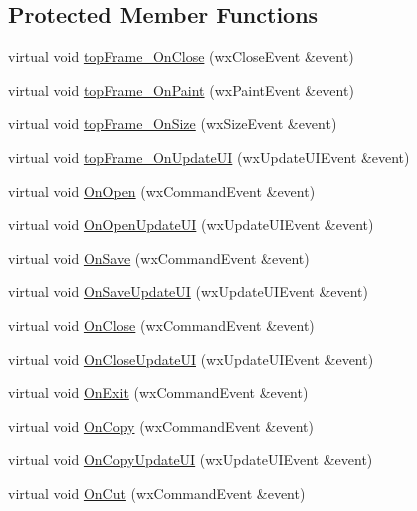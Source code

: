 \subsection*{Protected Member Functions}
\begin{DoxyCompactItemize}
\item 
virtual void \hyperlink{class_top_frame_aa5f73113b1457581e250a3c5fb8f0064}{top\-Frame\-\_\-\-On\-Close} (wx\-Close\-Event \&event)
\item 
virtual void \hyperlink{class_top_frame_a68d78b4baf77908eeccd2e6032b75f1b}{top\-Frame\-\_\-\-On\-Paint} (wx\-Paint\-Event \&event)
\item 
virtual void \hyperlink{class_top_frame_a834d6181bfec63909019441880f665a7}{top\-Frame\-\_\-\-On\-Size} (wx\-Size\-Event \&event)
\item 
virtual void \hyperlink{class_top_frame_ab41da1d8b60a477e0c2b8aa7ce584a54}{top\-Frame\-\_\-\-On\-Update\-U\-I} (wx\-Update\-U\-I\-Event \&event)
\item 
virtual void \hyperlink{class_top_frame_afbbfabd076b41bcab884206b6c6b0526}{On\-Open} (wx\-Command\-Event \&event)
\item 
virtual void \hyperlink{class_top_frame_a47e0020ef6fc50864c3ac66556ca1185}{On\-Open\-Update\-U\-I} (wx\-Update\-U\-I\-Event \&event)
\item 
virtual void \hyperlink{class_top_frame_a0171f3cd74c08fdd1c58e2d9448094ea}{On\-Save} (wx\-Command\-Event \&event)
\item 
virtual void \hyperlink{class_top_frame_a617c3d12f8fd373c84858c4d2f0cef34}{On\-Save\-Update\-U\-I} (wx\-Update\-U\-I\-Event \&event)
\item 
virtual void \hyperlink{class_top_frame_a62e531b947f11cd089a675807ff12269}{On\-Close} (wx\-Command\-Event \&event)
\item 
virtual void \hyperlink{class_top_frame_a5fa1106de0693c88325cd4c64ecbd94c}{On\-Close\-Update\-U\-I} (wx\-Update\-U\-I\-Event \&event)
\item 
virtual void \hyperlink{class_top_frame_aea48b19f458cbbc4c147440cfc690c46}{On\-Exit} (wx\-Command\-Event \&event)
\item 
virtual void \hyperlink{class_top_frame_a9881e6bb8be2e113e7d9fc2a716e24e6}{On\-Copy} (wx\-Command\-Event \&event)
\item 
virtual void \hyperlink{class_top_frame_a9d41733351b6db1434ec921cd7de8525}{On\-Copy\-Update\-U\-I} (wx\-Update\-U\-I\-Event \&event)
\item 
virtual void \hyperlink{class_top_frame_a0af1a4ab11be1ddd910029789b3dea3b}{On\-Cut} (wx\-Command\-Event \&event)

\end{DoxyCompactItemize}
